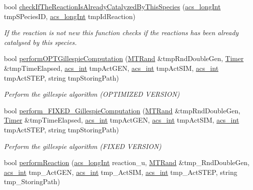 \begin{DoxyCompactItemize}
bool \hyperlink{a00011_ac4c90b07b8e75ea03e2ced0ea644a69f}{check\-If\-The\-Reaction\-Is\-Already\-Catalyzed\-By\-This\-Species} (\hyperlink{a00024_a19319d75f02db4308bc5c0026d98cd85}{acs\-\_\-long\-Int} tmp\-S\-Pecies\-I\-D, \hyperlink{a00024_a19319d75f02db4308bc5c0026d98cd85}{acs\-\_\-long\-Int} tmp\-Id\-Reaction)
\begin{DoxyCompactList}\small\item\em If the reaction is not new this function checks if the reactions has been already catalysed by this species. \end{DoxyCompactList}\item 
bool \hyperlink{a00011_ad4dcf928538066ff8a501dc7f72ac750}{perform\-O\-P\-T\-Gillespie\-Computation} (\hyperlink{a00016}{M\-T\-Rand} \&tmp\-Rnd\-Double\-Gen, \hyperlink{a00023}{Timer} \&tmp\-Time\-Elapsed, \hyperlink{a00024_a8d277355641a098190360234e2ebde35}{acs\-\_\-int} tmp\-Act\-G\-E\-N, \hyperlink{a00024_a8d277355641a098190360234e2ebde35}{acs\-\_\-int} tmp\-Act\-S\-I\-M, \hyperlink{a00024_a8d277355641a098190360234e2ebde35}{acs\-\_\-int} tmp\-Act\-S\-T\-E\-P, string tmp\-Storing\-Path)
\begin{DoxyCompactList}\small\item\em Perform the gillespie algorithm (O\-P\-T\-I\-M\-I\-Z\-E\-D V\-E\-R\-S\-I\-O\-N) \end{DoxyCompactList}\item 
bool \hyperlink{a00011_a847f333ec6acea11f2d0fc99bab52586}{perform\-\_\-\-F\-I\-X\-E\-D\-\_\-\-Gillespie\-Computation} (\hyperlink{a00016}{M\-T\-Rand} \&tmp\-Rnd\-Double\-Gen, \hyperlink{a00023}{Timer} \&tmp\-Time\-Elapsed, \hyperlink{a00024_a8d277355641a098190360234e2ebde35}{acs\-\_\-int} tmp\-Act\-G\-E\-N, \hyperlink{a00024_a8d277355641a098190360234e2ebde35}{acs\-\_\-int} tmp\-Act\-S\-I\-M, \hyperlink{a00024_a8d277355641a098190360234e2ebde35}{acs\-\_\-int} tmp\-Act\-S\-T\-E\-P, string tmp\-Storing\-Path)
\begin{DoxyCompactList}\small\item\em Perform the gillespie algorithm (F\-I\-X\-E\-D V\-E\-R\-S\-I\-O\-N) \end{DoxyCompactList}\item 
bool \hyperlink{a00011_a1db4e67ba458a54f4fab3e10a203765c}{perform\-Reaction} (\hyperlink{a00024_a19319d75f02db4308bc5c0026d98cd85}{acs\-\_\-long\-Int} reaction\-\_\-u, \hyperlink{a00016}{M\-T\-Rand} \&tmp\-\_\-\-Rnd\-Double\-Gen, \hyperlink{a00024_a8d277355641a098190360234e2ebde35}{acs\-\_\-int} tmp\-\_\-\-Act\-G\-E\-N, \hyperlink{a00024_a8d277355641a098190360234e2ebde35}{acs\-\_\-int} tmp\-\_\-\-Act\-S\-I\-M, \hyperlink{a00024_a8d277355641a098190360234e2ebde35}{acs\-\_\-int} tmp\-\_\-\-Act\-S\-T\-E\-P, string tmp\-\_\-\-Storing\-Path)

\end{DoxyCompactItemize}
